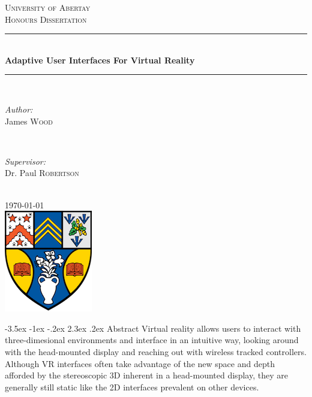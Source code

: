 \documentclass[12pt]{article}
\makeatletter
\renewcommand{\section}{\@startsection {section}{1}{\z@}%
             {-3.5ex \@plus -1ex \@minus -.2ex}%
             {2.3ex \@plus .2ex}%
             {\normalfont\Large\scshape\bfseries}}
\makeatother
\begin{document}
\begin{titlepage}

\newcommand{\HRule}{\rule{\linewidth}{0.5mm}}

\center

\textsc{\LARGE University of Abertay}\\[1.5cm]
\textsc{\Large Honours Dissertation}\\[0.5cm]

\HRule \\[0.4cm]
{ \huge \bfseries Adaptive User Interfaces For Virtual Reality}\\[0.4cm]
\HRule \\[1.5cm]

\begin{minipage}{0.4\textwidth}
\begin{flushleft} \large
\emph{Author:}\\
James \textsc{Wood}
\end{flushleft}
\end{minipage}
~
\begin{minipage}{0.4\textwidth}
\begin{flushright} \large
\emph{Supervisor:} \\
Dr. Paul \textsc{Robertson}
\end{flushright}
\end{minipage}\\[2cm]

{\large \today}\\[2cm]

\includegraphics{logo.png}\\[1cm]

\vfill

\end{titlepage}

\pagebreak

\tableofcontents
\listoffigures
\listoftables
\thispagestyle{empty}

\pagebreak

\setcounter{page}{1}

\section{Abstract}
Virtual reality allows users to interact with three-dimesional environments and interface in an intuitive way, looking around with the head-mounted display and reaching out with wireless tracked controllers. Although VR interfaces often take advantage of the new space and depth afforded by the stereoscopic 3D inherent in a head-mounted display, they are generally still static like the 2D interfaces prevalent on other devices.
\end{document}
